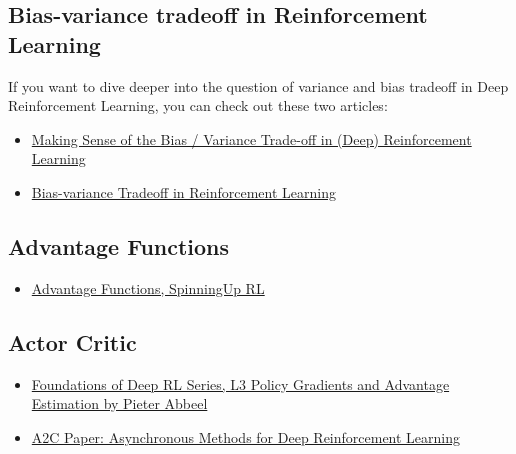 \documentclass[11pt,a4paper]{article}
\begin{document}
\subsection{Bias-variance tradeoff in Reinforcement Learning}\label{bias-variance-tradeoff-in-reinforcement-learning}

If you want to dive deeper into the question of variance and bias tradeoff in Deep Reinforcement Learning, you can check out these two articles:

\begin{itemize}
\tightlist
\item
  \href{https://blog.mlreview.com/making-sense-of-the-bias-variance-trade-off-in-deep-reinforcement-learning-79cf1e83d565}{Making Sense of the Bias / Variance Trade-off in (Deep) Reinforcement Learning}
\item
  \href{https://www.endtoend.ai/blog/bias-variance-tradeoff-in-reinforcement-learning/}{Bias-variance Tradeoff in Reinforcement Learning}
\end{itemize}

\subsection{Advantage Functions}\label{advantage-functions}

\begin{itemize}
\tightlist
\item
  \href{https://spinningup.openai.com/en/latest/spinningup/rl_intro.html?highlight=advantage\%20functio\#advantage-functions}{Advantage Functions, SpinningUp RL}
\end{itemize}

\subsection{Actor Critic}\label{actor-critic}

\begin{itemize}
\tightlist
\item
  \href{https://www.youtube.com/watch?v=AKbX1Zvo7r8}{Foundations of Deep RL Series, L3 Policy Gradients and Advantage Estimation by Pieter Abbeel}
\item
  \href{https://arxiv.org/abs/1602.01783v2}{A2C Paper: Asynchronous Methods for Deep Reinforcement Learning}
\end{itemize}
\end{document}
